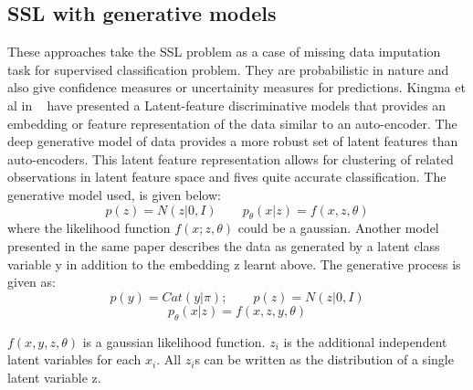 \documentclass[a4paper,11pt]{kth-mag}
\begin{document}
\subsection{SSL with generative models}
These approaches take the SSL problem as a case of missing data imputation task for supervised classification problem. They are probabilistic in nature and also give confidence measures or uncertainity measures for predictions. Kingma et al in ~\cite{kingma-2014} have presented a Latent-feature discriminative models that provides an embedding or feature representation of the data similar to an auto-encoder. The deep generative model of data provides a more robust set of latent features than auto-encoders. This latent feature representation allows for clustering of related observations in latent feature space and fives quite accurate classification. The generative model used, is given below:
\begin{equation}
p(z) = N(z|0, I)		\qquad	p_{\theta}(x|z) = f(x,z, \theta)
\end{equation}
where the likelihood function $f(x;z, \theta)$ could be a gaussian. Another model presented in the same paper describes the data as generated by a latent class variable y in addition to the embedding z learnt above. The generative process is given as:
\begin{equation}
p(y) = Cat(y|\pi); 		\qquad   p(z) = N(z|0, I) 
\end{equation}
\begin{equation}
p_{\theta}(x|z) = f(x,z,y,\theta)
\end{equation}

 $f(x,y,z,\theta)$ is a gaussian likelihood function. $z_{i}$ is the additional independent latent variables for each $x_{i}$. All $z_{i}$s can be written as the distribution of a single latent variable z. 
 
\end{document}

